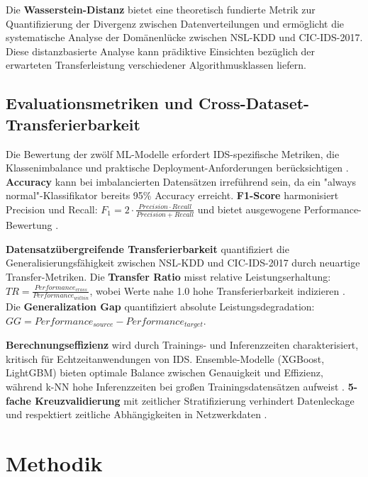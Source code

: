 \documentclass[11pt,a4paper]{article}
\begin{document}
    Die \textbf{Wasserstein-Distanz} bietet eine theoretisch fundierte Metrik zur Quantifizierung der Divergenz zwischen Datenverteilungen und ermöglicht die systematische Analyse der Domänenlücke zwischen NSL-KDD und CIC-IDS-2017. Diese distanzbasierte Analyse kann prädiktive Einsichten bezüglich der erwarteten Transferleistung verschiedener Algorithmusklassen liefern.

    \subsection{Evaluationsmetriken und Cross-Dataset-Transferierbarkeit}

    Die Bewertung der zwölf ML-Modelle erfordert IDS-spezifische Metriken, die Klassenimbalance und praktische Deployment-Anforderungen berücksichtigen \parencite{Belavagi2016}. \textbf{Accuracy} kann bei imbalancierten Datensätzen irreführend sein, da ein "always normal"-Klassifikator bereits 95\% Accuracy erreicht. \textbf{F1-Score} harmonisiert Precision und Recall: $F_1 = 2 \cdot \frac{Precision \cdot Recall}{Precision + Recall}$ und bietet ausgewogene Performance-Bewertung \parencite{Hastie2009}.

    \textbf{Datensatzübergreifende Transferierbarkeit} quantifiziert die Generalisierungsfähigkeit zwischen NSL-KDD und CIC-IDS-2017 durch neuartige Transfer-Metriken. Die \textbf{Transfer Ratio} misst relative Leistungserhaltung: $TR = \frac{Performance_{cross}}{Performance_{within}}$, wobei Werte nahe 1.0 hohe Transferierbarkeit indizieren \parencite{Mourouzis2021}. Die \textbf{Generalization Gap} quantifiziert absolute Leistungsdegradation: $GG = Performance_{source} - Performance_{target}$.

    \textbf{Berechnungseffizienz} wird durch Trainings- und Inferenzzeiten charakterisiert, kritisch für Echtzeitanwendungen von IDS. Ensemble-Modelle (XGBoost, LightGBM) bieten optimale Balance zwischen Genauigkeit und Effizienz, während k-NN hohe Inferenzzeiten bei großen Trainingsdatensätzen aufweist \parencite{Vinayakumar2019}. \textbf{5-fache Kreuzvalidierung} mit zeitlicher Stratifizierung verhindert Datenleckage und respektiert zeitliche Abhängigkeiten in Netzwerkdaten \parencite{Tavallaee2009}.

    \section{Methodik}
\end{document}
